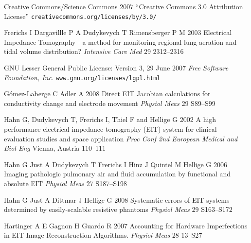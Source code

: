 \documentclass[12pt]{iopart}
\begin{document}
\item[]
Creative Commons/Science Commons 2007
``Creative Commons 3.0 Attribution License''
\verb+creativecommons.org/licenses/by/3.0/+

%
\item[]
Frerichs I Dargavillle P A Dudykevych T Rimensberger P M 2003
Electrical Impedance Tomography - a method for monitoring
regional lung aeration and tidal volume distribution?
{\em  Intensive Care Med}
29 2312--2316

\item[]
GNU Lesser General Public License: Version 3, 29 June 2007
{\em Free Software Foundation, Inc.}
\verb+www.gnu.org/licenses/lgpl.html+

\item[]
G\'omez-Laberge C Adler A 2008
Direct EIT Jacobian calculations for conductivity change and electrode movement
{\em Physiol Meas}
29 S89--S99



\item[]
Hahn G, Dudykevych T, Frerichs I, Thiel F and Hellige G 2002
A high performance electrical impedance tomography
(EIT) system for clinical evaluation studies and space application
{\em Proc Conf 2nd European Medical and
Biol Eng} Vienna, Austria 110--111

\item[]
Hahn G Just A Dudykevych T Frerichs I Hinz J  Quintel M Hellige G
2006
Imaging pathologic pulmonary air and fluid accumulation by
 functional and absolute EIT
{\em Physiol Meas}
27 S187--S198

\item[]
Hahn G Just A Dittmar J  Hellige G 2008
Systematic errors of EIT systems determined by easily-scalable
 resistive phantoms
{\em Physiol Meas}
 29 S163--S172



\item[]
Hartinger A E Gagnon H Guardo R 2007
Accounting for Hardware Imperfections in EIT Image
Reconstruction Algorithms.
{\em Physiol Meas}
28 13--S27
 
\end{document}
